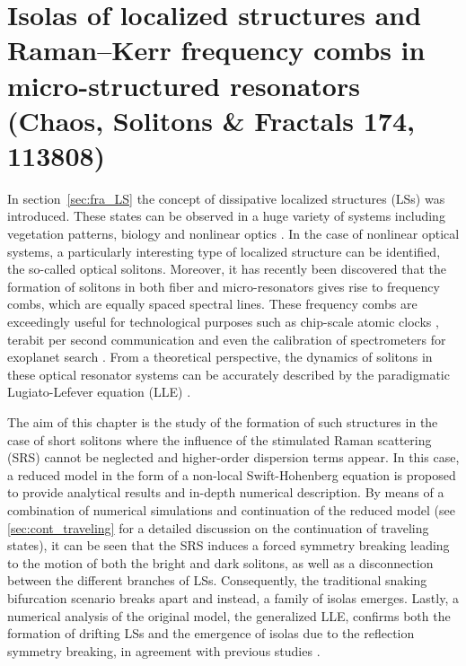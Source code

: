 \chapter{Isolas of localized structures and Raman–Kerr frequency combs in micro-structured resonators (Chaos, Solitons \& Fractals 174, 113808)}

In section~\ref{sec:fra_LS} the concept of dissipative 
localized structures (LSs) was introduced. These states can be observed in a huge variety
of systems including vegetation patterns, biology and 
nonlinear optics \cite{tlidi2014localized,heimburg2005soliton}. In the case of nonlinear optical systems,
a particularly interesting type of localized structure can be identified,
the so-called optical solitons. Moreover, it has recently been discovered that the formation of solitons
in both fiber and micro-resonators gives rise to frequency combs, which are equally
spaced spectral lines. These frequency combs are exceedingly useful
for technological purposes such as chip-scale atomic clocks \cite{Jost2015clock}, terabit
per second communication \cite{marin2017microresonator} and even the calibration of spectrometers
for exoplanet search \cite{suh2019searching}. From a theoretical perspective, the dynamics
of solitons in these optical resonator systems can be accurately described 
by the paradigmatic Lugiato-Lefever equation (LLE) \cite{lugiatolefever1987}.

The aim of this chapter is the study of the formation of such structures in the
case of short solitons where the influence of the stimulated Raman scattering (SRS)
cannot be neglected and higher-order dispersion terms appear. In this case, a reduced model
in the form of a non-local Swift-Hohenberg equation is proposed to provide 
analytical results and in-depth numerical description. By means of a combination of
numerical simulations and
continuation of the reduced model (see \ref{sec:cont_traveling} for a detailed discussion on the
continuation of traveling states), it can be seen that the SRS induces a forced symmetry
breaking leading to the motion of both the bright and dark solitons, as well as a disconnection between 
the different branches of LSs. Consequently, the traditional snaking bifurcation scenario breaks
apart and instead, a family of isolas emerges. Lastly, a numerical analysis of the
original model, the generalized LLE, confirms both the formation of drifting LSs and
the emergence of isolas due to the reflection symmetry breaking, in agreement with previous studies \cite{burke2009swift,parra2014third}.

